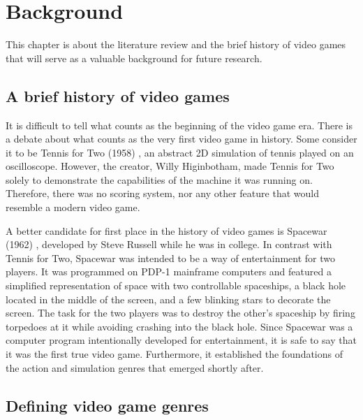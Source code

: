 \chapter{Background} \label{Chapter:Background}

This chapter is about the literature review and the brief history of video games that will serve as a valuable background for future research.

\section{A brief history of video games}

It is difficult to tell what counts as the beginning of the video game era. There is a debate about what counts as the very first video game in history. Some consider it to be Tennis for Two (1958) \cite{tennisfortwo1958}, an abstract 2D simulation of tennis played on an oscilloscope. However, the creator, Willy Higinbotham, made Tennis for Two solely to demonstrate the capabilities of the machine it was running on. Therefore, there was no scoring system, nor any other feature that would resemble a modern video game. \cite{malliet2005history}

A better candidate for first place in the history of video games is Spacewar (1962) \cite{spacewar1962}, developed by Steve Russell while he was in college. In contrast with Tennis for Two, Spacewar was intended to be a way of entertainment for two players. It was programmed on PDP-1 mainframe computers and featured a simplified representation of space with two controllable spaceships, a black hole located in the middle of the screen, and a few blinking stars to decorate the screen. The task for the two players was to destroy the other's spaceship by firing torpedoes at it while avoiding crashing into the black hole. Since Spacewar was a computer program intentionally developed for entertainment, it is safe to say that it was the first true video game. Furthermore, it established the foundations of the action and simulation genres that emerged shortly after. \cite{malliet2005history}



\section{Defining video game genres}


